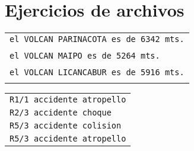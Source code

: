 \section{Ejercicios de archivos}
\begin{table}[htbp]
\begin{center}
\begin{tabular}{|l|}
\hline
\texttt{el VOLCAN PARINACOTA es de 6342 mts.} \\
\\
\texttt{el VOLCAN MAIPO es de 5264 mts.} \\
\\
\texttt{el VOLCAN LICANCABUR es de 5916 mts.} \\
\\
\hline
\end{tabular}
\end{center}
\end{table}
\begin{table}[htbp]
\begin{center}
\begin{tabular}{|l|}
\hline
\texttt{R1/1 accidente atropello} \\
\texttt{R2/3 accidente choque} \\
\texttt{R5/3 accidente colision} \\
\texttt{R5/3 accidente atropello} \\ \hline
\end{tabular}
\end{center}
\end{table}